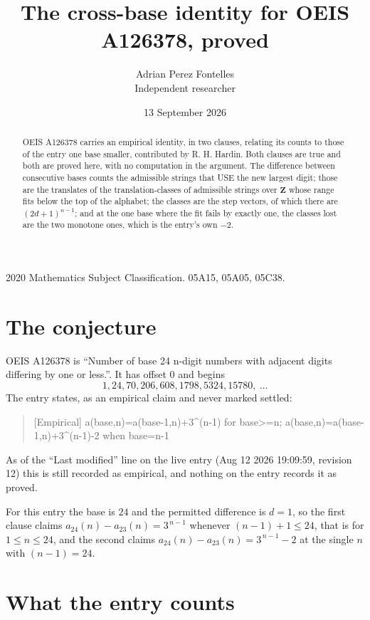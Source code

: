 \documentclass[11pt,a4paper]{article}
\title{The cross-base identity for OEIS A126378, proved}
\author{Adrian Perez Fontelles\\ \small Independent researcher}
\date{13 September 2026}
\theoremstyle{plain}
\theoremstyle{definition}
\begin{document}
\maketitle

\begin{abstract}
OEIS A126378 carries an empirical identity, in two clauses, relating its counts to those of the
entry one base smaller, contributed by R. H. Hardin. Both clauses are true and both are proved
here, with no computation in the argument. The difference between consecutive bases counts the
admissible strings that USE the new largest digit; those are the translates of the
translation-classes of admissible strings over $\mathbf{Z}$ whose range fits below the top of
the alphabet; the classes are the step vectors, of which there are $(2d+1)^{n-1}$; and at the
one base where the fit fails by exactly one, the classes lost are the two monotone ones, which
is the entry's own $-2$.
\end{abstract}

\noindent\small 2020 Mathematics Subject Classification. 05A15, 05A05, 05C38.\normalsize

\section{The conjecture}

OEIS A126378 is ``Number of base 24 n-digit numbers with adjacent digits differing by one or less.''. It has offset $0$ and begins
\[
1, 24, 70, 206, 608, 1798, 5324, 15780,\ \dots
\]
The entry states, as an empirical claim and never marked settled:
\begin{quote}
[Empirical] a(base,n)=a(base-1,n)+3\textasciicircum{}(n-1) for base>=n; a(base,n)=a(base-1,n)+3\textasciicircum{}(n-1)-2 when base=n-1
\end{quote}
As of the ``Last modified'' line on the live entry (Aug 12 2026 19:09:59, revision 12)
this is still recorded as empirical, and nothing on the entry records it as proved.

For this entry the base is $24$ and the permitted difference is $d=1$, so the first clause
claims $a_{24}(n)-a_{23}(n)=3^{\,n-1}$ whenever $(n-1)+1\le24$, that is for
$1\le n\le24$, and the second claims $a_{24}(n)-a_{23}(n)=3^{\,n-1}-2$ at the single
$n$ with $(n-1)=24$.

\section{What the entry counts}
\end{document}
